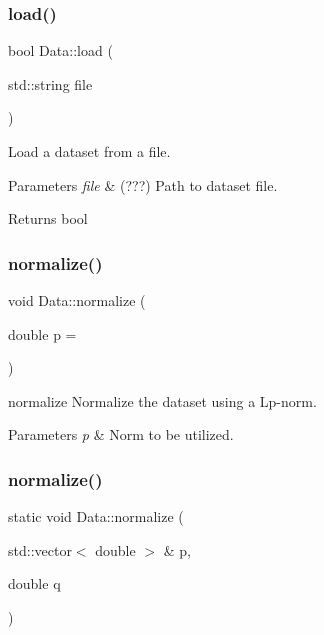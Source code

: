 \subsubsection{\texorpdfstring{load()}{load()}}
{\footnotesize\ttfamily bool Data\+::load (\begin{DoxyParamCaption}\item[{std\+::string}]{file }\end{DoxyParamCaption})}



Load a dataset from a file. 


\begin{DoxyParams}{Parameters}
{\em file} & (???) Path to dataset file. \\
\hline
\end{DoxyParams}
\begin{DoxyReturn}{Returns}
bool 
\end{DoxyReturn}
\mbox{\label{class_data_a38bbab57bd9d871bd78771df47529d6b}} 
\subsubsection{\texorpdfstring{normalize()}{normalize()}\hspace{0.1cm}{\footnotesize\ttfamily [1/2]}}
{\footnotesize\ttfamily void Data\+::normalize (\begin{DoxyParamCaption}\item[{double}]{p = {} }\end{DoxyParamCaption})}



normalize Normalize the dataset using a Lp-\/norm. 


\begin{DoxyParams}{Parameters}
{\em p} & Norm to be utilized. \\
\hline
\end{DoxyParams}
\mbox{\label{class_data_acd8fd65a56a3d097d1bc19fb8249ee20}} 
\subsubsection{\texorpdfstring{normalize()}{normalize()}\hspace{0.1cm}{\footnotesize\ttfamily [2/2]}}
{\footnotesize\ttfamily static void Data\+::normalize (\begin{DoxyParamCaption}\item[{std\+::vector$<$ double $>$ \&}]{p,  }\item[{double}]{q }\end{DoxyParamCaption})\hspace{0.3cm}{\ttfamily [static]}}



